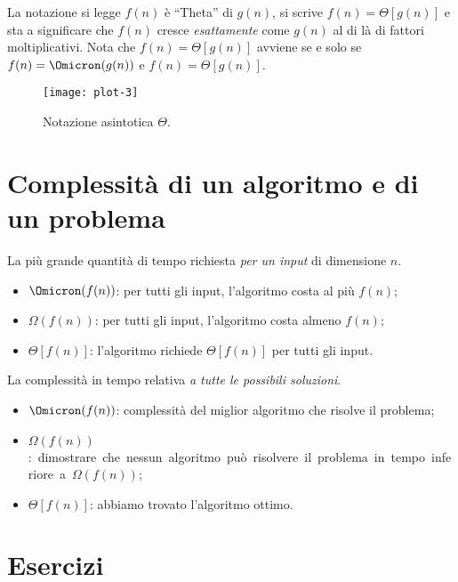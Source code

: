 La notazione si legge \(f(n)\) è \enquote{Theta} di \(g(n)\), si scrive \(f(n) = \Theta[g(n)]\) e sta a significare che \(f(n)\) cresce \emph{esattamente} come \(g(n)\) al di là di fattori moltiplicativi.
Nota che \(f(n) = \Theta[g(n)]\) avviene se e solo se \(f(n) = \Omicron(g(n))\) e \(f(n) = \Theta[g(n)]\).

\begin{figure}[H]\centering
	\texttt{[image: plot-3]}
	\caption{Notazione asintotica \(\Theta\).}
	\label{fig:plot-3}
\end{figure}

\section{Complessità di un algoritmo e di un problema}

\begin{definition}
La più grande quantità di tempo richiesta \emph{per un input} di dimensione \(n\).
\end{definition}
\begin{itemize}
	\item \(\Omicron(f(n))\): per tutti gli input, l'algoritmo costa al più \(f(n)\);
	\item \(\Omega(f(n))\): per tutti gli input, l'algoritmo costa almeno \(f(n)\);
	\item \(\Theta[f(n)]\): l'algoritmo richiede \(\Theta[f(n)]\) per tutti gli input.
\end{itemize}

\begin{definition}
La complessità in tempo relativa \emph{a tutte le possibili soluzioni}.
\end{definition}
\begin{itemize}
	\item \(\Omicron(f(n))\): complessità del miglior algoritmo che risolve il problema;
	\item \mbox{\(\Omega(f(n))\): dimostrare che nessun algoritmo può risolvere il problema in tempo inferiore a \(\Omega(f(n))\)};
	\item \(\Theta[f(n)]\): abbiamo trovato l'algoritmo ottimo.
\end{itemize}

\clearpage
\section{Esercizi}

